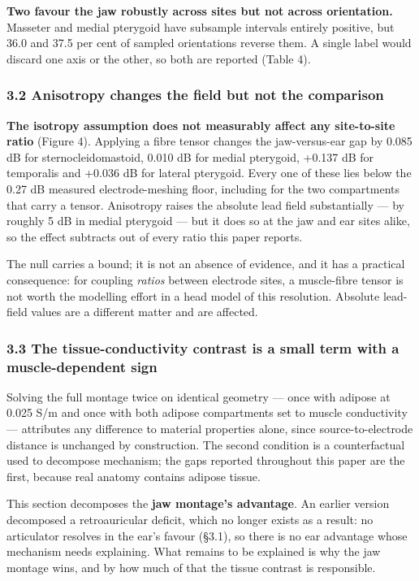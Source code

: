 \documentclass[
  11pt,
  letterpaper,
]{article}
\begin{document}
\textbf{Two favour the jaw robustly across sites but not across orientation.}
Masseter and medial pterygoid have subsample intervals entirely positive, but
36.0 and 37.5 per cent of sampled orientations reverse them. A single label
would discard one axis or the other, so both are reported (Table 4).

\subsubsection{3.2 Anisotropy changes the field but not the comparison}\label{anisotropy-changes-the-field-but-not-the-comparison}

\textbf{The isotropy assumption does not measurably affect any site-to-site ratio}
(Figure 4).
Applying a fibre tensor changes the jaw-versus-ear gap by \textminus{}0.085 dB for
sternocleidomastoid, \textminus{}0.010 dB for medial pterygoid, +0.137 dB for temporalis
and +0.036 dB for lateral pterygoid. Every one of these lies below the 0.27 dB
measured electrode-meshing floor, including for the two compartments that
carry a tensor. Anisotropy raises the absolute lead field substantially --- by
roughly 5 dB in medial pterygoid --- but it does so at the jaw and ear sites
alike, so the effect subtracts out of every ratio this paper reports.

The null carries a bound; it is not an absence of evidence, and it has a
practical consequence: for coupling \emph{ratios} between electrode sites, a
muscle-fibre tensor is not worth the modelling effort in a head model of this
resolution. Absolute lead-field values are a different matter and are affected.

\subsubsection{3.3 The tissue-conductivity contrast is a small term with a muscle-dependent sign}\label{the-tissue-conductivity-contrast-is-a-small-term-with-a-muscle-dependent-sign}

Solving the full montage twice on identical geometry --- once with adipose at
0.025 S/m and once with both adipose compartments set to muscle conductivity ---
attributes any difference to material properties alone, since source-to-electrode
distance is unchanged by construction. The second condition is a counterfactual
used to decompose mechanism; the gaps reported throughout this paper are the
first, because real anatomy contains adipose tissue.

This section decomposes the \textbf{jaw montage's advantage}. An earlier version
decomposed a retroauricular deficit, which no longer exists as a result: no
articulator resolves in the ear's favour (\S{}3.1), so there is no ear advantage
whose mechanism needs explaining. What remains to be explained is why the jaw
montage wins, and by how much of that the tissue contrast is responsible.
\end{document}
